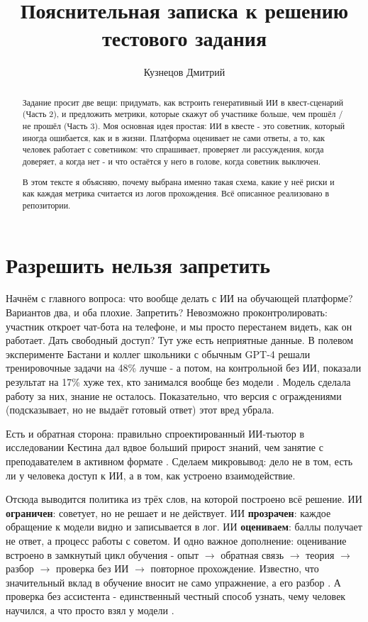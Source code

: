\documentclass[12pt,a4paper]{article}
\title{Пояснительная записка к решению тестового задания}
\author{Кузнецов Дмитрий}
\date{}
\begin{document}
\maketitle

\begin{abstract}
Задание просит две вещи: придумать, как встроить генеративный ИИ в квест-сценарий (Часть 2), и предложить метрики, которые скажут об участнике больше, чем прошёл / не прошёл (Часть 3). Моя основная идея простая: ИИ в квесте - это советник, который иногда ошибается, как и в жизни. Платформа оценивает не сами ответы, а то, как человек работает с советником: что спрашивает, проверяет ли рассуждения, когда доверяет, а когда нет - и что остаётся у него в голове, когда советник выключен.

В этом тексте я объясняю, почему выбрана именно такая схема, какие у неё риски и как каждая метрика считается из логов прохождения. Всё описанное реализовано в репозитории.
\end{abstract}

\pagebreak

\section{Разрешить нельзя запретить}

Начнём с главного вопроса: что вообще делать с ИИ на обучающей платформе? Вариантов два, и оба плохие. Запретить? Невозможно проконтролировать: участник откроет чат-бота на телефоне, и мы просто перестанем видеть, как он работает. Дать свободный доступ? Тут уже есть неприятные данные. В полевом эксперименте Бастани и коллег школьники с обычным GPT-4 решали тренировочные задачи на 48\% лучше - а потом, на контрольной без ИИ, показали результат на 17\% хуже тех, кто занимался вообще без модели \cite{bastani2025}. Модель сделала работу за них, знание не осталось. Показательно, что версия с ограждениями (подсказывает, но не выдаёт готовый ответ) этот вред убрала.

Есть и обратная сторона: правильно спроектированный ИИ-тьютор в исследовании Кестина дал вдвое больший прирост знаний, чем занятие с преподавателем в активном формате \cite{kestin2025}. Сделаем микровывод: дело не в том, есть ли у человека доступ к ИИ, а в том, как устроено взаимодействие.

Отсюда выводится политика из трёх слов, на которой построено всё решение. ИИ \textbf{ограничен}: советует, но не решает и не действует. ИИ \textbf{прозрачен}: каждое обращение к модели видно и записывается в лог. ИИ \textbf{оцениваем}: баллы получает не ответ, а процесс работы с советом. И одно важное дополнение: оценивание встроено в замкнутый цикл обучения - опыт \(\to\) обратная связь \(\to\) теория \(\to\) разбор \(\to\) проверка без ИИ \(\to\) повторное прохождение. Известно, что значительный вклад в обучение вносит не само упражнение, а его разбор \cite{fanning2007}. А проверка без ассистента - единственный честный способ узнать, чему человек научился, а что просто взял у модели \cite{bastani2025, koedinger2007}.
\end{document}
